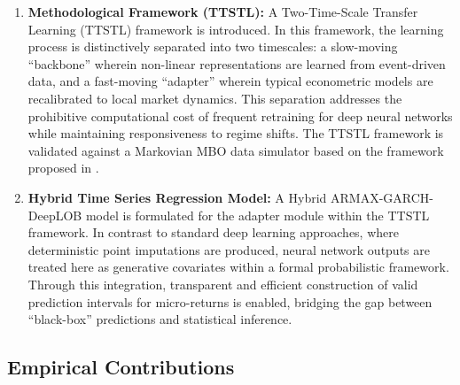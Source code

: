 \documentclass[10pt,a4paper,oneside]{article}
\begin{document}
\begin{enumerate}
    \item \textbf{Methodological Framework (TTSTL):} A Two-Time-Scale Transfer Learning (TTSTL) framework is introduced. In this framework, the learning process is distinctively separated into two timescales: a slow-moving ``backbone'' wherein non-linear representations are learned from event-driven data, and a fast-moving ``adapter'' wherein typical econometric models are recalibrated to local market dynamics. This separation addresses the prohibitive computational cost of frequent retraining for deep neural networks while maintaining responsiveness to regime shifts. The TTSTL framework is validated against a Markovian MBO data simulator based on the framework proposed in \cite{cont2023mathematical}.

    \item \textbf{Hybrid Time Series Regression Model:} A Hybrid ARMAX-GARCH-DeepLOB model is formulated for the adapter module within the TTSTL framework. In contrast to standard deep learning approaches, where deterministic point imputations are produced, neural network outputs are treated here as generative covariates within a formal probabilistic framework. Through this integration, transparent and efficient construction of valid prediction intervals for micro-returns is enabled, bridging the gap between ``black-box'' predictions and statistical inference.
\end{enumerate}

\subsection{Empirical Contributions}
\end{document}

